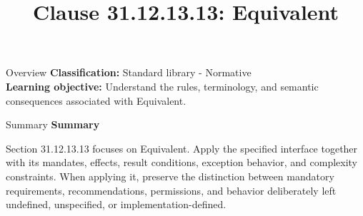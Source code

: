 \documentclass[10pt,letterpaper]{article}
\title{Clause 31.12.13.13: Equivalent}
\author{}
\date{}
\begin{document}
\maketitle
\begin{CornellOverviewBox}{Overview}
\textbf{Classification:} Standard library - Normative\\[2pt]
\textbf{Learning objective:} Understand the rules, terminology, and semantic consequences associated with Equivalent.
\end{CornellOverviewBox}\begin{CornellSummaryBox}{Summary}
{\sffamily\bfseries\color{Accent} Summary}\par\vspace{3pt}Section 31.12.13.13 focuses on Equivalent. Apply the specified interface together with its mandates, effects, result conditions, exception behavior, and complexity constraints. When applying it, preserve the distinction between mandatory requirements, recommendations, permissions, and behavior deliberately left undefined, unspecified, or implementation-defined.
\end{CornellSummaryBox}
\end{document}
